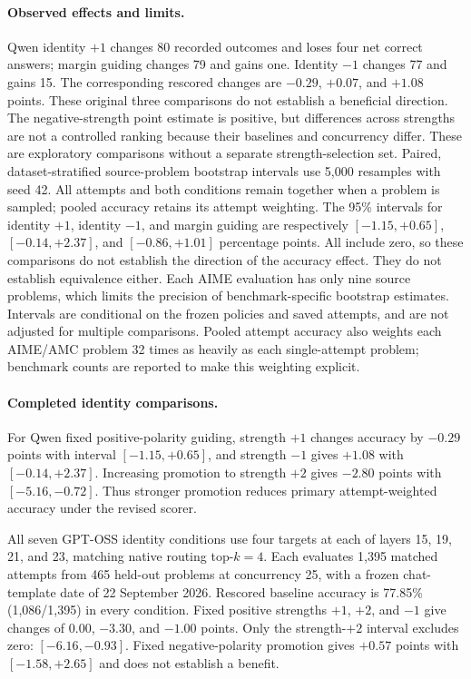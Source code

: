 \paragraph{Observed effects and limits.}
Qwen identity $+1$ changes 80 recorded outcomes and loses four net correct
answers; margin guiding changes 79 and gains one. Identity $-1$ changes
77 and gains 15. The corresponding rescored changes are $-0.29$,
$+0.07$, and $+1.08$ points. These original three comparisons do not
establish a beneficial direction. The negative-strength point estimate is positive, but differences across
strengths are not a controlled ranking because their baselines and
concurrency differ. These are exploratory comparisons without a separate strength-selection set.
Paired, dataset-stratified source-problem bootstrap intervals use 5,000
resamples with seed 42. All attempts and both conditions remain together
when a problem is sampled; pooled accuracy retains its attempt weighting.
The 95\% intervals for identity $+1$, identity $-1$, and margin guiding
are respectively $[-1.15,+0.65]$, $[-0.14,+2.37]$, and
$[-0.86,+1.01]$ percentage points. All include zero, so these comparisons
do not establish the direction of the accuracy effect. They do not establish
equivalence either. Each AIME evaluation has only nine source problems,
which limits the precision of benchmark-specific bootstrap estimates.
Intervals are conditional on the frozen policies and saved attempts, and
are not adjusted for multiple comparisons.
Pooled attempt accuracy also weights each AIME/AMC problem 32 times as
heavily as each single-attempt problem; benchmark counts are reported to
make this weighting explicit.

\paragraph{Completed identity comparisons.}
For Qwen fixed positive-polarity guiding, strength $+1$ changes accuracy
by $-0.29$ points with interval $[-1.15,+0.65]$, and strength $-1$ gives
$+1.08$ with $[-0.14,+2.37]$. Increasing promotion to strength $+2$
gives $-2.80$ points with $[-5.16,-0.72]$. Thus stronger promotion
reduces primary attempt-weighted accuracy under the revised scorer.

All seven GPT-OSS identity conditions use four targets at each of layers
15, 19, 21, and 23, matching native routing top-$k=4$. Each evaluates
1,395 matched attempts from 465 held-out problems at concurrency 25,
with a frozen chat-template date of 22 September 2026. Rescored baseline
accuracy is 77.85\% (1,086/1,395) in every condition.
Fixed positive strengths $+1$, $+2$, and $-1$ give changes of $0.00$,
$-3.30$, and $-1.00$ points. Only the strength-$+2$ interval excludes
zero: $[-6.16,-0.93]$. Fixed negative-polarity promotion gives $+0.57$
points with $[-1.58,+2.65]$ and does not establish a benefit.

